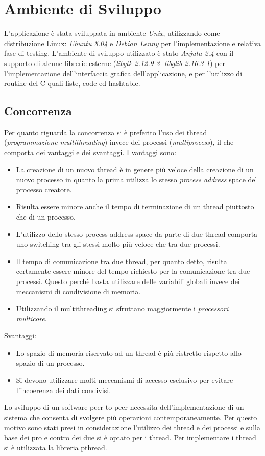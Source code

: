 \chapter{Ambiente di Sviluppo}
L'applicazione è stata sviluppata in ambiente \textit{Unix}, utilizzando come distribuzione Linux: \textit{Ubuntu 8.04} e \textit{Debian Lenny} per l'implementazione e relativa fase di testing.
L'ambiente di sviluppo utilizzato è stato \textit{Anjuta 2.4} con il supporto di alcune librerie esterne (\textit{libgtk 2.12.9-3} -\textit{libglib 2.16.3-1}) per l'implementazione dell'interfaccia grafica dell'applicazione, e per l'utilizzo di routine del C quali liste, code ed hashtable.
\section{Concorrenza}
Per quanto riguarda la concorrenza si è preferito l'uso dei thread (\textit{programmazione multithreading}) invece dei processi (\textit{multiprocess}), il che comporta dei vantaggi e dei svantaggi. I vantaggi sono: 
\begin{itemize}
\item La creazione di un nuovo thread è in genere più veloce della creazione di un nuovo processo in quanto la prima utilizza lo stesso \textit{process address} space del processo creatore. 
\item Risulta essere minore anche il tempo di terminazione di un thread piuttosto che di un processo. 
\item L'utilizzo dello stesso process address space da parte di due thread comporta uno switching tra gli stessi molto più veloce che tra due processi. 
\item ll tempo di comunicazione tra due thread, per quanto detto, risulta certamente essere minore del tempo richiesto per la comunicazione tra due processi. Questo perchè basta utilizzare delle variabili globali invece dei meccanismi di condivisione di memoria.
\item Utilizzando il multithreading si sfruttano maggiormente i \textit{processori multicore}.
\end{itemize}
Svantaggi:
\begin{itemize}
\item Lo spazio di memoria riservato ad un thread è più ristretto rispetto allo spazio di un processo.
\item Si devono utilizzare molti meccanismi di accesso esclusivo per evitare l'incoerenza dei dati condivisi.
\end{itemize}
Lo sviluppo di un software peer to peer necessita dell’implementazione di un sistema che consenta di svolgere più operazioni contemporaneamente. Per questo motivo sono stati presi in considerazione l’utilizzo dei thread e dei processi e sulla base dei pro e contro dei due si è optato per i thread. Per implementare i thread si è utilizzata la libreria pthread.
